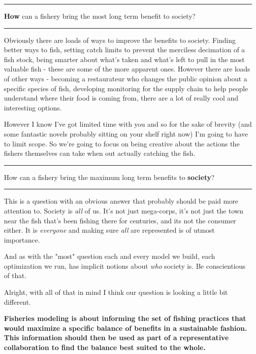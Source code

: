 \documentclass[11pt,a5paper]{book}
\begin{document}
\noindent \rule{\textwidth}{0.5pt} 
\noindent \textbf{How} can a fishery bring the most long term benefit to society?
\newline
\rule{\textwidth}{0.5pt} 
\vspace{5pt}

Obviously there are loads of ways to improve the benefits to society. Finding better ways to fish, setting catch limits to prevent the merciless decimation of a fish stock, being smarter about what's taken and what's left to pull in the most valuable fish - these are some of the more apparent ones. However there are loads of other ways - becoming a restaurateur who changes the public opinion about a specific species of fish, developing monitoring for the supply chain to help people understand where their food is coming from, there are a lot of really cool and interesting options. 
\newline

However I know I've got limited time with you and so for the sake of brevity (and some fantastic novels probably sitting on your shelf right now) I'm going to have to limit scope. So we're going to focus on being creative about the actions the fishers themselves can take when out actually catching the fish. 
\newpage

\noindent \rule{\textwidth}{0.5pt} 
\noindent  How can a fishery bring the maximum long term benefits to \textbf{society}?
\newline
\rule{\textwidth}{0.5pt} 
\vspace{5pt}

This is a question with an obvious answer that probably should be paid more attention to. Society is \textit{all} of us. It's not just mega-corps, it's not just the town near the fish that's been fishing there for centuries, and its not the consumer either. It is \textit{everyone} and making sure \textit{all} are represented is of utmost importance. 
\newline

And as with the "most" question each and every model we build, each optimization we run, has implicit notions about \textit{who} society is. Be conscientious of that. 
\newpage

Alright, with all of that in mind I think our question is looking a little bit different. 
\newline

 \hangindent=1cm \noindent \textbf{Fisheries modeling is about informing the set of fishing practices that would maximize a specific balance of benefits in a sustainable fashion. This information should then be used as part of a representative collaboration to find the balance best suited to the whole.}
\newline
\end{document}
